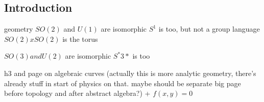 
\subsection{Introduction}

geometry
	\(SO(2)\) and \(U(1)\) are isomorphic
		\(S^1\) is too, but not a group language
	\(SO(2)xSO(2)\) is the torus

	\(SO(3) and U(2)\) are isomorphic
		\(S^*3*\) is too

h3 and page on algebraic curves (actually this is more analytic geometry, there's already stuff in start of physics on that. maybe should be separate big page before topology and after abstract algebra?)
+ \(f(x, y) = 0\)


